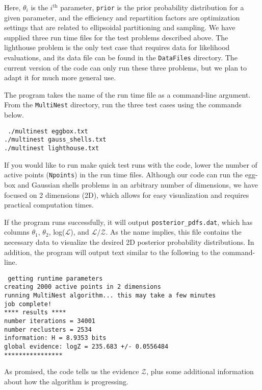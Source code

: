 \documentclass{article}
\def\mrm{\mathrm}
\begin{document}
\noindent Here, $\theta_i$ is the $i^\mrm{th}$ parameter, {\tt prior} is the prior probability distribution for a given parameter, and the efficiency and repartition factors are optimization settings that are related to ellipsoidal partitioning and sampling. We have supplied three run time files for the test problems described above. The lighthouse problem is the only test case that requires data for likelihood evaluations, and its data file can be found in the {\tt DataFiles} directory. The current version of the code can only run these three problems, but we plan to adapt it for much more general use. 

The program takes the name of the run time file as a command-line argument. From the {\tt MultiNest} directory, run the three test cases using the commands below.

\begin{adjustwidth*}{5cm}{3.5cm}
 {\tt 
 ./multinest eggbox.txt\\
./multinest gauss\_shells.txt\\
 ./multinest lighthouse.txt\\
 }
 \end{adjustwidth*}
 
\noindent If you would like to run make quick test runs with the code, lower the number of active points ({\tt Npoints}) in the run time files. Although our code can run the egg-box and Gaussian shells problems in an arbitrary number of dimensions, we have focused on 2 dimensions (2D), which allows for easy visualization and requires practical computation times. 

If the program runs successfully, it will output {\tt posterior\_pdfs.dat}, which has columns  $\theta_1$, $\theta_2$, log($\mathcal{L}$), and $\mathcal{L/Z}$. As the name implies, this file contains the necessary data to visualize the desired 2D posterior probability distributions. In addition, the program will output text similar to the following to the command-line. 

\begin{adjustwidth*}{1.2cm}{1.2cm}
{\tt
getting runtime parameters\\
creating 2000 active points in 2 dimensions\\
running MultiNest algorithm... this may take a few minutes\\
job complete!\\
**** results ****\\
number iterations = 34001\\
number reclusters = 2534\\
information: H =  8.9353 bits\\
global evidence: logZ = 235.683 +/- 0.0556484\\
****************}
\end{adjustwidth*}

As promised, the code tells us the evidence $\mathcal{Z}$, plus some additional information about how the algorithm is progressing. 



\end{document}
